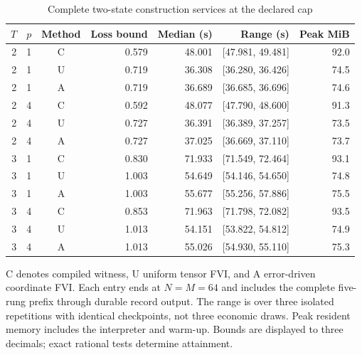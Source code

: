 \begin{table}[htbp]
\centering
\caption{Complete two-state construction services at the declared cap}\label{tab:core48}
\footnotesize
\begin{tabular}{rrcrrrr}
\toprule
$T$ & $p$ & Method & Loss bound & Median (s) & Range (s) & Peak MiB\\
\midrule
2 & 1 & C & 0.579 & 48.001 & [47.981, 49.481] & 92.0 \\
2 & 1 & U & 0.719 & 36.308 & [36.280, 36.426] & 74.5 \\
2 & 1 & A & 0.719 & 36.689 & [36.685, 36.696] & 74.6 \\
2 & 4 & C & 0.592 & 48.077 & [47.790, 48.600] & 91.3 \\
2 & 4 & U & 0.727 & 36.391 & [36.389, 37.257] & 73.5 \\
2 & 4 & A & 0.727 & 37.025 & [36.669, 37.110] & 73.7 \\
3 & 1 & C & 0.830 & 71.933 & [71.549, 72.464] & 93.1 \\
3 & 1 & U & 1.003 & 54.649 & [54.146, 54.650] & 74.8 \\
3 & 1 & A & 1.003 & 55.677 & [55.256, 57.886] & 75.5 \\
3 & 4 & C & 0.853 & 71.963 & [71.798, 72.082] & 93.5 \\
3 & 4 & U & 1.013 & 54.151 & [53.822, 54.812] & 74.9 \\
3 & 4 & A & 1.013 & 55.026 & [54.930, 55.110] & 75.3 \\
\bottomrule
\end{tabular}
\begin{minipage}{0.97\linewidth}\footnotesize\vspace{3pt}
C denotes compiled witness, U uniform tensor FVI, and A error-driven coordinate FVI. Each entry ends at $N=M=64$ and includes the complete five-rung prefix through durable record output. The range is over three isolated repetitions with identical checkpoints, not three economic draws. Peak resident memory includes the interpreter and warm-up. Bounds are displayed to three decimals; exact rational tests determine attainment.
\end{minipage}
\end{table}
